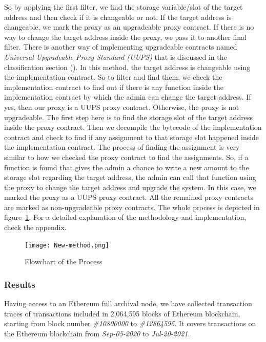 So by applying the first filter, we find the storage variable/slot of the target address and then check if it is changeable or not. If the target address is changeable, we mark the proxy as an upgradeable proxy contract.
If there is no way to change the target address inside the proxy, we pass it to another final filter. There is another way of implementing upgradeable contracts named \textit{Universal Upgradeable Proxy Standard (UUPS)} that is discussed in the classification section (). In this method, the target address is changeable using the implementation contract. So to filter and find them, we check the implementation contract to find out if there is any function inside the implementation contract by which the admin can change the target address. If yes, then our proxy is a UUPS proxy contract. Otherwise, the proxy is not upgradeable. The first step here is to find the storage slot of the target address inside the proxy contract. Then we decompile the bytecode of the implementation contract and check to find if any assignment to that storage slot happened inside the implementation contract. The process of finding the assignment is very similar to how we checked the proxy contract to find the assignments. So, if a function is found that gives the admin a chance to write a new amount to the storage slot regarding the target address, the admin can call that function using the proxy to change the target address and upgrade the system. In this case, we marked the proxy as a UUPS proxy contract.
All the remained proxy contracts are marked as non-upgradeable proxy contracts. The whole process is depicted in figure~\ref{flowchart}. For a detailed explanation of the methodology and implementation, check the appendix.

\begin{figure}[t!]
  \texttt{[image: New-method.png]}\label{flowchart}
  \caption{Flowchart of the Process}
\end{figure}



\subsubsection{Results}

Having access to an Ethereum full archival node, we have collected transaction traces of transactions included in 2,064,595 blocks of Ethereum blockchain, starting from block number \textit{\#10800000} to \textit{\#12864595}. It covers transactions on the Ethereum blockchain from \textit{Sep-05-2020} to \textit{Jul-20-2021}. 

